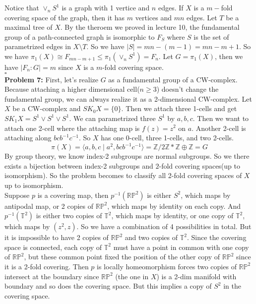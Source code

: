 \documentclass[12pt]{amsart}
\newcommand{\Z}{\mathbb{Z}}
\begin{document}
Notice that $\vee_n S^1$ is a graph with 1 vertice and $n$ edges. If $X$ is a $m-$fold covering space of the graph, then it has $m$ vertices and $mn$ edges. Let $T$ be a maximal tree of $X$. By the theroem we proved in lecture 10, the fundamental group of a path-connected graph is isomorphic to $F_S$ where $S$ is the set of parametrized edges in $X\setminus T$. So we have $|S|=mn-(m-1)=mn-m+1$. So we have $\pi_1(X)\cong F_{mn-m+1}\leq \pi_1(\vee_n S^1)=F_n$. Let $G=\pi_1(X)$, then we have $|F_n:G|=m$ since $X$ is a $m$-fold covering space.
\\\phantom{qed}\hfill$\square$\\
\textbf{Problem 7:} First, let's realize $G$ as a fundamental group of a CW-complex. Because attaching a higher dimensional cell($n\geq 3$) doesn't change the fundamental group, we can always realize it as a 2-dimensional CW-complex. Let $X$ be a CW-complex and $SK_0X=\{0\}$. Then we attach three 1-cells and get $SK_1X=S^1\vee S^1\vee S^1$. We can parametrized three $S^1$ by $a,b,c$. Then we want to attach one 2-cell where the attaching map is $f(z)=z^2$ on $a$. Another 2-cell is attaching along $bcb^{-1}c^{-1}$. So $X$ has one 0-cell, three 1-cells, and two 2-cells.
\[\pi(X)=\langle a,b,c\mid a^2,bcb^{-1}c^{-1}\rangle=\Z/2\Z\ast \Z\oplus \Z=G\]
By group theory, we know index-2 subgroups are normal subgroups. So we there exists a bijection between index-2 subgroups and $2$-fold covering spaces(up to isomorphism). So the problem becomes to classify all 2-fold covering spaces of $X$ up to isomorphism. \\
Suppose $p$ is a covering map, then $p^{-1}(\mathbb{RP}^2)$ is either $S^2$, which maps by antipodal map, or 2 copies of $\mathbb{RP}^2$, which maps by identity on each copy. And $p^{-1}({\mathbb{T}^2})$ is either two copies of $\mathbb{T}^2$, which maps by identity, or one copy of $\mathbb{T}^2$, which maps by $(z^2,z)$. So we have a combination of 4 possibilities in total. But it is impossible to have 2 copies of $\mathbb{RP}^2$ and two copies of $\mathbb{T}^2$. Since the covering space is connected, each copy of $\mathbb{T}^2$ must have a point in common with one copy of $\mathbb{RP}^2$, but these common point fixed the position of the other copy of $\mathbb{RP}^2$ since it is a 2-fold covering. Then $p$ is locally homeomorphism forces two copies of $\mathbb{RP}^2$ intersect at the boundary since $\mathbb{RP}^2$ (the one in $X$) is a 2-dim manifold with boundary and so does the covering space. But this implies a copy of $S^2$ in the covering space.\\
\end{document}
